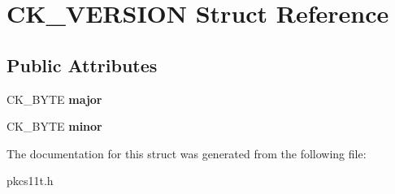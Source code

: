 \hypertarget{struct_c_k___v_e_r_s_i_o_n}{}\section{C\+K\+\_\+\+V\+E\+R\+S\+I\+ON Struct Reference}
\label{struct_c_k___v_e_r_s_i_o_n}
\subsection*{Public Attributes}
\begin{DoxyCompactItemize}
\item 
\mbox{\label{struct_c_k___v_e_r_s_i_o_n_ac66d4dfdec725c04681bdbb6f64f490a}} 
C\+K\+\_\+\+B\+Y\+TE {\bfseries major}
\item 
\mbox{\label{struct_c_k___v_e_r_s_i_o_n_a00a75bcce8f80272abfeb9f8ffc0030c}} 
C\+K\+\_\+\+B\+Y\+TE {\bfseries minor}
\end{DoxyCompactItemize}


The documentation for this struct was generated from the following file\+:\begin{DoxyCompactItemize}
\item 
pkcs11t.\+h\end{DoxyCompactItemize}
